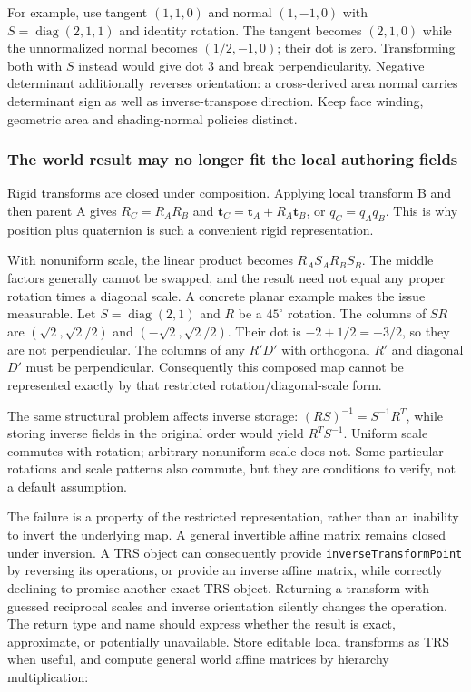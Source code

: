 For example, use tangent \((1,1,0)\) and normal \((1,-1,0)\) with \(S=\operatorname{diag}(2,1,1)\) and identity rotation. The tangent becomes \((2,1,0)\) while the unnormalized normal becomes \((1/2,-1,0)\); their dot is zero. Transforming both with \(S\) instead would give dot \(3\) and break perpendicularity. Negative determinant additionally reverses orientation: a cross-derived area normal carries determinant sign as well as inverse-transpose direction. Keep face winding, geometric area and shading-normal policies distinct.

\subsubsection{The world result may no longer fit the local authoring fields}\label{the-world-result-may-no-longer-fit-the-local-authoring-fields}

Rigid transforms are closed under composition. Applying local transform B and then parent A gives \(R_C=R_AR_B\) and \(\mathbf t_C=\mathbf t_A+R_A\mathbf t_B\), or \(q_C=q_Aq_B\). This is why position plus quaternion is such a convenient rigid representation.

With nonuniform scale, the linear product becomes \(R_AS_AR_BS_B\). The middle factors generally cannot be swapped, and the result need not equal any proper rotation times a diagonal scale. A concrete planar example makes the issue measurable. Let \(S=\operatorname{diag}(2,1)\) and \(R\) be a \(45^\circ\) rotation. The columns of \(SR\) are \((\sqrt2,\sqrt2/2)\) and \((-\sqrt2,\sqrt2/2)\). Their dot is \(-2+1/2=-3/2\), so they are not perpendicular. The columns of any \(R'D'\) with orthogonal \(R'\) and diagonal \(D'\) must be perpendicular. Consequently this composed map cannot be represented exactly by that restricted rotation/diagonal-scale form.

The same structural problem affects inverse storage: \((RS)^{-1}=S^{-1}R^T\), while storing inverse fields in the original order would yield \(R^TS^{-1}\). Uniform scale commutes with rotation; arbitrary nonuniform scale does not. Some particular rotations and scale patterns also commute, but they are conditions to verify, not a default assumption.

The failure is a property of the restricted representation, rather than an inability to invert the underlying map. A general invertible affine matrix remains closed under inversion. A TRS object can consequently provide \texttt{inverseTransformPoint} by reversing its operations, or provide an inverse affine matrix, while correctly declining to promise another exact TRS object. Returning a transform with guessed reciprocal scales and inverse orientation silently changes the operation. The return type and name should express whether the result is exact, approximate, or potentially unavailable. Store editable local transforms as TRS when useful, and compute general world affine matrices by hierarchy multiplication:

